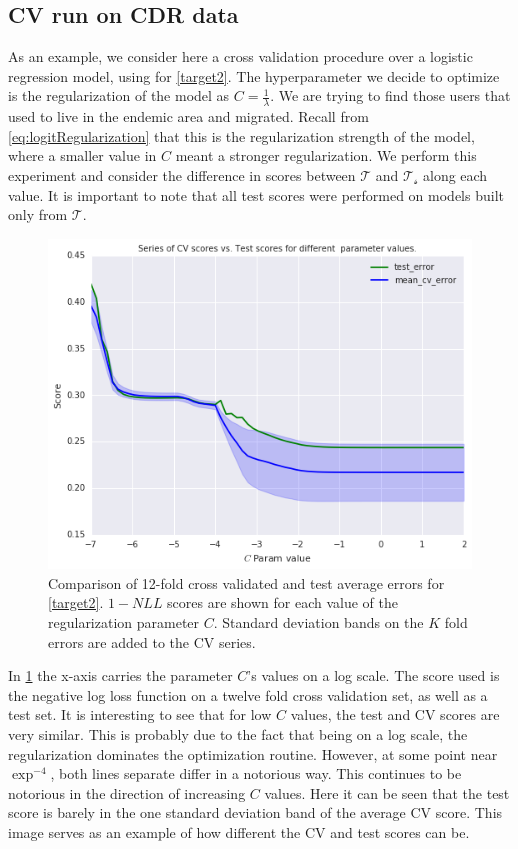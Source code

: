 \subsection{CV run on CDR data}\label{subsection:cvExperiment}

As an example, we consider here a cross validation procedure over a logistic regression model, using for \cref{target2}.
The hyperparameter we decide to optimize is the regularization of the model as $C = \frac{1}{\lambda}$. 
We are trying to find those users that used to live in the endemic area and migrated. 
Recall from \cref{eq:logitRegularization} that this is the regularization strength of the model, where a smaller value in $C$ meant a stronger regularization.
We perform this experiment and consider the difference in scores between  $\mathcal{T}$ and $\mathcal{T_s}$ along each value.
It is important to note that all test scores were performed on models built only from $\mathcal{T}$.


\begin{figure}[h!]
\begin{center}
\includegraphics[width=0.7\columnwidth]{figures/cross_validation/train_and_cv_score_comparison_logreg.jpg}
\caption{ Comparison of 12-fold cross validated and test average errors for \cref{target2}.   $1-NLL$ scores are shown for each value of the regularization parameter $C$. Standard deviation bands on the $K$ fold errors are added to the CV series.}
\label{fig:cv_vs_test_score}
\end{center}
\end{figure}

In \cref{fig:cv_vs_test_score} the x-axis carries the parameter $C$'s values on a log scale. 
The score used is the negative log loss function on a twelve fold cross validation set, as well as a test set. 
It is interesting to see that for low $C$ values, the test and CV scores are very similar. 
This is probably due to the fact that being on a log scale, the regularization dominates the optimization routine.
However, at some point near $\exp^{-4}$, both lines separate differ in a notorious way.
This continues to be notorious in the direction of increasing $C$ values.
Here it can be seen that the test score is barely in the one standard deviation band of the average CV score.
This image serves as an example of how different the CV and test scores can be. 


